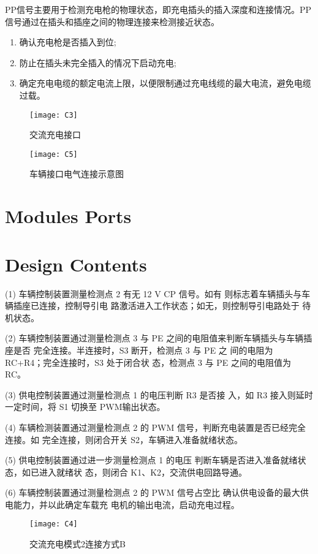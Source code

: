  PP信号主要用于检测充电枪的物理状态，即充电插头的插入深度和连接情况。PP信号通过在插头和插座之间的物理连接来检测接近状态。
 \begin{enumerate}
    \item  确认充电枪是否插入到位;
    \item  防止在插头未完全插入的情况下启动充电;
    \item  确定充电电缆的额定电流上限，以便限制通过充电线缆的最大电流，避免电缆过载。
 \end{enumerate}

 \begin{figure}[!htbp]
    \centering
    \texttt{[image: C3]}
    \caption{交流充电接口}
    \label{fig:C3}
\end{figure}

\begin{figure}[!htbp]
    \centering
    \texttt{[image: C5]}
    \caption{车辆接口电气连接示意图}
    \label{fig:C5}
\end{figure}

\section{Modules Ports}


\section{Design Contents}

(1) 车辆控制装置测量检测点 2 有无 12 V CP 信号。如有
则标志着车辆插头与车辆插座已连接，控制导引电
路激活进入工作状态；如无，则控制导引电路处于
待机状态。%

(2) 车辆控制装置通过测量检测点 3 与
PE 之间的电阻值来判断车辆插头与车辆插座是否
完全连接。半连接时，S3 断开，检测点 3 与 PE 之
间的电阻为 RC+R4；完全连接时，S3 处于闭合状
态，检测点 3 与 PE 之间的电阻值为 RC。

(3) 供电控制装置通过测量检测点 1 的电压判断 R3 是否接
入，如 R3 接入则延时一定时间，将 S1 切换至 PWM输出状态。

(4) 车辆检测装置通过测量检测点 2 的
PWM 信号，判断充电装置是否已经完全连接。如
完全连接，则闭合开关 S2，车辆进入准备就绪状态。

(5) 供电控制装置通过进一步测量检测点 1 的电压
判断车辆是否进入准备就绪状态，如已进入就绪状
态，则闭合 K1、K2，交流供电回路导通。%

(6) 车辆控制装置通过测量检测点 2 的 PWM 信号占空比
确认供电设备的最大供电能力，并以此确定车载充
电机的输出电流，启动充电过程。%


\begin{figure}[!htbp]
    \centering
    \texttt{[image: C4]}
    \caption{交流充电模式2连接方式B}
    \label{fig:C3}
\end{figure}